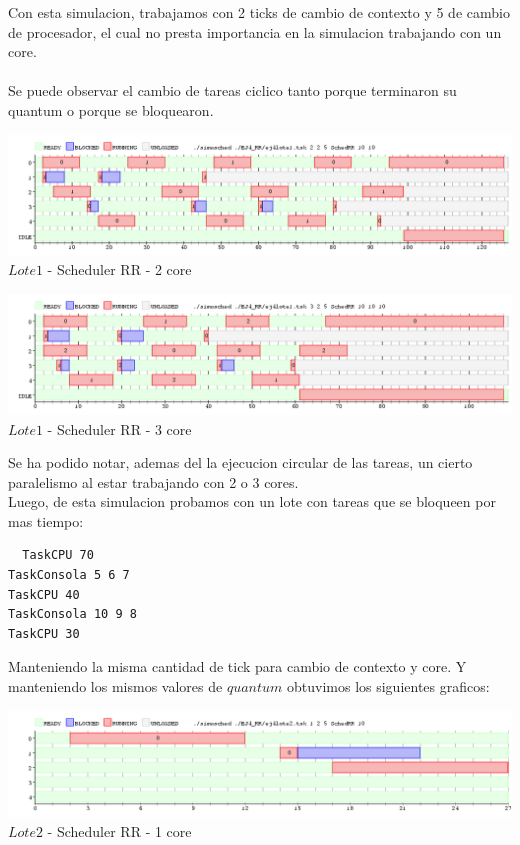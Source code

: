\indent Con esta simulacion, trabajamos con 2 ticks de cambio de contexto y 5 de cambio de procesador, el cual no presta importancia
en la simulacion trabajando con un core.\\
\\
\indent Se puede observar el cambio de tareas ciclico tanto porque terminaron su quantum o porque se bloquearon.\\

\begin{center}
  	\includegraphics[width=450pt]{./EJ4_RR/ejercicio4-2nucleo.png}
	  {$Lote 1$ - Scheduler RR - 2 core}	
\end{center}

\begin{center}
  	\includegraphics[width=450pt]{./EJ4_RR/ejercicio4-3nucleo.png}
	  {$Lote 1$ - Scheduler RR - 3 core}	
\end{center}

\indent Se ha podido notar, ademas del la ejecucion circular de las tareas, un cierto paralelismo al estar trabajando con
2 o 3 cores.\\

\indent Luego, de esta simulacion probamos con un lote con tareas que se bloqueen por mas tiempo:
 \begin{verbatim}
  TaskCPU 70
TaskConsola 5 6 7
TaskCPU 40
TaskConsola 10 9 8
TaskCPU 30
 \end{verbatim}

\indent Manteniendo la misma cantidad de tick para cambio de contexto y core. Y manteniendo los mismos valores
de $quantum$ obtuvimos los siguientes graficos:

\begin{center}
    	\includegraphics[width=450pt]{./EJ4_RR/ejercicio4-2lote1nucleo.png}
	{$Lote 2$ - Scheduler RR - 1 core}	
 \end{center}

